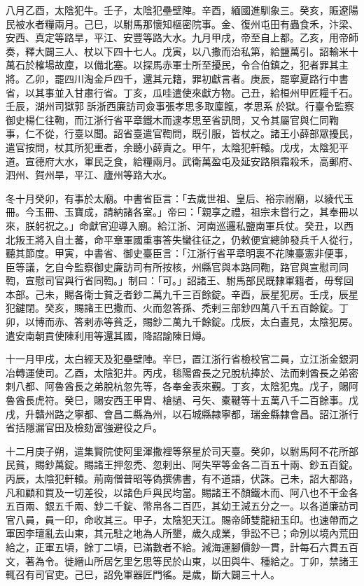 \begin{pinyinscope}
 八月乙酉，太陰犯牛。壬子，太陰犯壘壁陣。辛酉，緬國進馴象三。癸亥，賑遼陽民被水者糧兩月。己巳，以駙馬那懷知樞密院事。金、復州屯田有蟲食禾，汴梁、安西、真定等路旱，平江、安豐等路大水。九月甲戌，帝至自上都。乙亥，用帝師奏，釋大闢三人、杖以下四十七人。戊寅，以八撒而治私第，給鹽萬引。詔輸米十萬石於榷場故廩，以備北塞。以探馬赤軍士所至擾民，令合伯鎮之，犯者罪其主將。乙卯，罷四川淘金戶四千，還其元籍，罪初獻言者。庚辰，罷寧夏路行中書省，以其事並入甘肅行省。丁亥，瓜哇遣使來獻方物。己丑，給桓州甲匠糧千石。壬辰，湖州司獄郭訴浙西廉訪司僉事張孝思多取廩餼，孝思系於獄。行臺令監察御史楊仁往鞫，而江浙行省平章鐵木而逮孝思至省訊問，又令其屬官與仁同鞫事，仁不從，行臺以聞。詔省臺遣官鞫問，既引服，皆杖之。諸王小薛部眾擾民，遣官按問，杖其所犯重者，余聽小薛責之。甲午，太陰犯軒轅。戊戌，太陰犯平道。宣德府大水，軍民乏食，給糧兩月。武衛萬盈屯及延安路隕霜殺禾，高郵府、泗州、賀州旱，平江、廬州等路大水。



 冬十月癸卯，有事於太廟。中書省臣言：「去歲世祖、皇后、裕宗祔廟，以綾代玉冊。今玉冊、玉寶成，請納諸各室。」帝曰：「親享之禮，祖宗未嘗行之，其奉冊以來，朕躬祝之。」命獻官迎導入廟。給江浙、河南巡邏私鹽南軍兵仗。癸丑，以西北叛王將入自土蕃，命平章軍國重事答失蠻往征之，仍敕便宜總帥發兵千人從行，聽其節度。甲寅，中書省、御史臺臣言：「江浙行省平章明裏不花陳臺憲非便事，臣等議，乞自今監察御史廉訪司有所按核，州縣官與本路同鞫，路官與宣慰司同鞫，宣慰司官與行省同鞫。」制曰：「可。」詔諸王、駙馬部民既隸軍籍者，毋奪回本部。己未，賜各衛士貧乏者鈔二萬九千三百餘錠。辛酉，辰星犯房。壬戌，辰星犯鍵閉。癸亥，賜諸王巴撒而、火而忽答孫、禿剌三部鈔四萬八千五百餘錠。丁卯，以博而赤、答剌赤等貧乏，賜鈔二萬九千餘錠。戊辰，太白晝見，太陰犯房。遣安南朝貢使陳利用等還其國，降詔諭陳日燇。



 十一月甲戌，太白經天及犯壘壁陣。辛巳，置江浙行省檢校官二員，立江浙金銀洞冶轉運使司。乙酉，太陰犯井。丙戌，毯陽酋長之兄脫杭捧於、法而剌酋長之弟密剌八都、阿魯酋長之弟脫杭忽先等，各奉金表來覲。丁亥，太陰犯鬼。戊子，賜阿魯酋長虎符。癸巳，賜安西王甲胄、槍撾、弓矢、橐鞬等十五萬八千二百餘事。戊戌，升贛州路之寧都、會昌二縣為州，以石城縣隸寧都，瑞金縣隸會昌。詔江浙行省括隱漏官田及檢劾富強避役之戶。



 十二月庚子朔，遣集賢院使阿里渾撒裡等祭星於司天臺。癸卯，以駙馬阿不花所部民貧，賜鈔萬錠。賜諸王押忽禿、忽剌出、阿失罕等金各二百五十兩、鈔五百錠。丙辰，太陰犯軒轅。荊南僧普昭等偽撰佛書，有不道語，伏誅。己未，詔大都路，凡和顧和買及一切差役，以諸色戶與民均當。賜諸王不顏鐵木而、阿八也不干金各五百兩、銀五千兩、鈔二千錠、幣帛各二百匹，其幼王減五分之一。以各道廉訪司官八員，員一印，命收其三。甲子，太陰犯天江。賜帝師雙龍紐玉印。也速帶而之軍因李璮亂去山東，其元駐之地為人所墾，歲久成業，爭訟不已；命別以境內荒田給之，正軍五頃，餘丁二頃，已滿數者不給。減海運腳價鈔一貫，計每石六貫五百文，著為令。徙縉山所居乞里乞思等民於山東，以田與牛、種給之。丁卯，禁諸王輒召有司官吏。己巳，詔免軍器匠門徭。是歲，斷大闢三十人。



\end{pinyinscope}